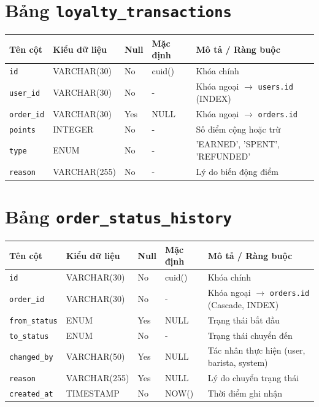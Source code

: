 \section{Bảng \texttt{loyalty\_transactions}}
\begin{table}[htbp]
\centering
\small
\begin{tabularx}{\textwidth}{llllX}
\toprule
\textbf{Tên cột} & \textbf{Kiểu dữ liệu} & \textbf{Null} & \textbf{Mặc định} & \textbf{Mô tả / Ràng buộc} \\
\midrule
\texttt{id} & VARCHAR(30) & No & cuid() & Khóa chính \\
\texttt{user\_id} & VARCHAR(30) & No & - & Khóa ngoại \(\to\) \texttt{users.id} (INDEX) \\
\texttt{order\_id} & VARCHAR(30) & Yes & NULL & Khóa ngoại \(\to\) \texttt{orders.id} \\
\texttt{points} & INTEGER & No & - & Số điểm cộng hoặc trừ \\
\texttt{type} & ENUM & No & - & 'EARNED', 'SPENT', 'REFUNDED' \\
\texttt{reason} & VARCHAR(255) & No & - & Lý do biến động điểm \\
\bottomrule
\end{tabularx}
\end{table}

\section{Bảng \texttt{order\_status\_history}}
\begin{table}[htbp]
\centering
\small
\begin{tabularx}{\textwidth}{llllX}
\toprule
\textbf{Tên cột} & \textbf{Kiểu dữ liệu} & \textbf{Null} & \textbf{Mặc định} & \textbf{Mô tả / Ràng buộc} \\
\midrule
\texttt{id} & VARCHAR(30) & No & cuid() & Khóa chính \\
\texttt{order\_id} & VARCHAR(30) & No & - & Khóa ngoại \(\to\) \texttt{orders.id} (Cascade, INDEX) \\
\texttt{from\_status} & ENUM & Yes & NULL & Trạng thái bắt đầu \\
\texttt{to\_status} & ENUM & No & - & Trạng thái chuyển đến \\
\texttt{changed\_by} & VARCHAR(50) & Yes & NULL & Tác nhân thực hiện (user, barista, system) \\
\texttt{reason} & VARCHAR(255) & Yes & NULL & Lý do chuyển trạng thái \\
\texttt{created\_at} & TIMESTAMP & No & NOW() & Thời điểm ghi nhận \\
\bottomrule
\end{tabularx}
\end{table}
